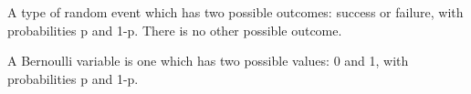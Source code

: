 A type of random event which has two possible outcomes: success or failure,
with probabilities p and 1-p. There is no other possible outcome.
\par
A Bernoulli variable is one which has two possible values: 0 and 1,
with probabilities p and 1-p.